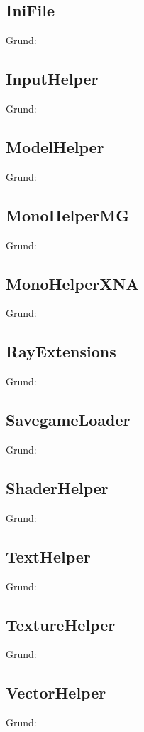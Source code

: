 \subsection{IniFile}
Grund:
\subsection{InputHelper}
Grund:
\subsection{ModelHelper}
Grund:
\subsection{MonoHelperMG}
Grund:
\subsection{MonoHelperXNA}
Grund:
\subsection{RayExtensions}
Grund:
\subsection{SavegameLoader}
Grund:
\subsection{ShaderHelper}
Grund:
\subsection{TextHelper}
Grund:
\subsection{TextureHelper}
Grund:
\subsection{VectorHelper}
Grund:



